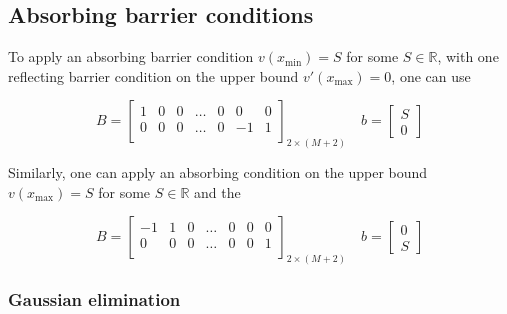 \documentclass[11pt]{article}
\theoremstyle{definition}
\begin{document}
\subsection{Absorbing barrier conditions}

To apply an absorbing barrier condition $v(x_{\min}) =S$ for some $S \in \mathbb{R}$, with one reflecting barrier condition on the upper bound $v'(x_{\max}) = 0$, one can use

\begin{equation}\label{eq:absorbing-barrier-matrix}
B = \begin{bmatrix}
1 & 0 & 0 & \dots & 0 & 0 & 0 \\
0 & 0 & 0 & \dots & 0 & -1 & 1\\
\end{bmatrix}_{2 \times (M+2)} \quad 
b = \begin{bmatrix}
S \\
0
\end{bmatrix}
\end{equation}

Similarly, one can apply an absorbing condition on the upper bound  $v(x_{\max}) =S$ for some $S \in \mathbb{R}$ and the 


\begin{equation}\label{eq:absorbing-barrier-matrix-ub}
B = \begin{bmatrix}
-1 & 1 & 0 & \dots & 0 & 0 & 0 \\
0 & 0 & 0 & \dots & 0 & 0 & 1\\
\end{bmatrix}_{2 \times (M+2)} \quad 
b = \begin{bmatrix}
0 \\
S
\end{bmatrix}
\end{equation}

\subsubsection{Gaussian elimination}
\end{document}
